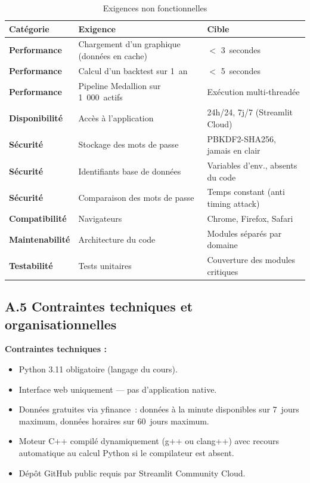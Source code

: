 \documentclass[a4paper, 12pt, twoside]{article}
\begin{document}
    \begin{table}[h]
    \centering
    \begin{tabular}{|>{\bfseries}l|l|p{4cm}|}
    \hline
    Catégorie & Exigence & Cible \\
    \hline
    Performance & Chargement d'un graphique (données en cache) & $<$ 3~secondes \\
    Performance & Calcul d'un backtest sur 1~an & $<$ 5~secondes \\
    Performance & Pipeline Medallion sur 1~000~actifs & Exécution multi-threadée \\
    Disponibilité & Accès à l'application & 24h/24, 7j/7 (Streamlit Cloud) \\
    Sécurité & Stockage des mots de passe & PBKDF2-SHA256, jamais en clair \\
    Sécurité & Identifiants base de données & Variables d'env., absents du code \\
    Sécurité & Comparaison des mots de passe & Temps constant (anti timing attack) \\
    Compatibilité & Navigateurs & Chrome, Firefox, Safari \\
    Maintenabilité & Architecture du code & Modules séparés par domaine \\
    Testabilité & Tests unitaires & Couverture des modules critiques \\
    \hline
    \end{tabular}
    \caption{Exigences non fonctionnelles}
    \end{table}

    \subsection*{A.5 Contraintes techniques et organisationnelles}

    \textbf{Contraintes techniques :}
    \begin{itemize}
        \item Python 3.11 obligatoire (langage du cours).
        \item Interface web uniquement --- pas d'application native.
        \item Données gratuites via yfinance~: données à la minute
              disponibles sur 7~jours maximum, données horaires sur 60~jours
              maximum.
        \item Moteur C++ compilé dynamiquement (g++ ou clang++) avec
              recours automatique au calcul Python si le compilateur est
              absent.
        \item Dépôt GitHub public requis par Streamlit Community Cloud.
    \end{itemize}
\end{document}
